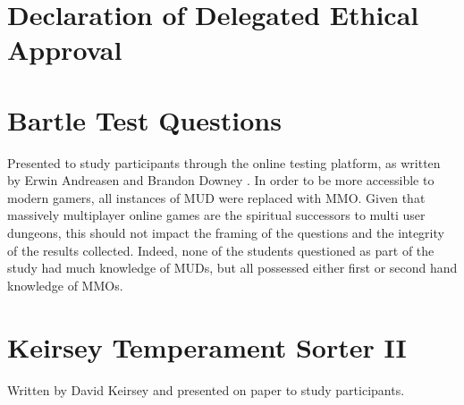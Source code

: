 \documentclass[12pt,a4paper,twoside]{report}
\begin{document}
\begin{appendices}
	
\chapter{Declaration of Delegated Ethical Approval}
\label{sec:bsrec}

	
\chapter{Bartle Test Questions}
\label{sec:bartle}
Presented to study participants through the online testing platform, as written by Erwin Andreasen and Brandon Downey \cite{bartle-questions}. In order to be more accessible to modern gamers, all instances of MUD were replaced with MMO. Given that massively multiplayer online games are the spiritual successors to multi user dungeons, this should not impact the framing of the questions and the integrity of the results collected. Indeed, none of the students questioned as part of the study had much knowledge of MUDs, but all possessed either first or second hand knowledge of MMOs.
\clearpage
\linespread{1.0}

\linespread{1.3}

\chapter{Keirsey Temperament Sorter II}
\label{sec:keirsey}
Written by David Keirsey \cite{keirsey1998please} and presented on paper to study participants.

\end{appendices}



\end{document}
